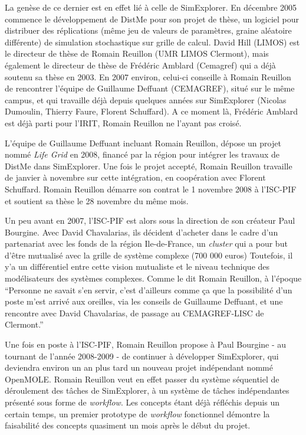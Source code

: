 La genèse de ce dernier est en effet lié à celle de SimExplorer. En décembre 2005 \textcite{Reuillon2008} commence le développement de DistMe pour son projet de thèse, un logiciel pour distribuer des réplications (même jeu de valeurs de paramètres, graine aléatoire différente) de simulation stochastique sur grille de calcul. David Hill (LIMOS) est le directeur de thèse de Romain Reuillon (UMR LIMOS Clermont), mais également le directeur de thèse de Frédéric Amblard (Cemagref) qui a déjà soutenu sa thèse en 2003. En 2007 environ, celui-ci conseille à Romain Reuillon de rencontrer l'équipe de Guillaume Deffuant (CEMAGREF), situé sur le même campus, et qui travaille déjà depuis quelques années sur SimExplorer (Nicolas Dumoulin, Thierry Faure, Florent Schuffard). A ce moment là, Frédéric Amblard est déjà parti pour l'IRIT, Romain Reuillon ne l'ayant pas croisé.

L'équipe de Guillaume Deffuant incluant Romain Reuillon, dépose un projet nommé \textit{Life Grid} en 2008, financé par la région pour intégrer les travaux de DistMe dans SimExplorer. Une fois le projet accepté, Romain Reuillon travaille de janvier à novembre sur cette intégration, en coopération avec Florent Schuffard. Romain Reuillon démarre son contrat le 1 novembre 2008 à l'ISC-PIF et soutient sa thèse le 28 novembre du même mois.

Un peu avant en 2007, l'ISC-PIF est alors sous la direction de son créateur Paul Bourgine. Avec David Chavalarias, ils décident d'acheter dans le cadre d'un partenariat avec les fonds de la région Ile-de-France, un \textit{cluster} qui a pour but d'être mutualisé avec la grille de système complexe (700 000 euros) Toutefois, il y'a un différentiel entre cette vision mutualiste et le niveau technique des modélisateurs des systèmes complexes. Comme le dit Romain Reuillon, à l'époque \enquote{Personne ne savait s'en servir, c'est d'ailleurs comme ça que la possibilité d'un poste m'est arrivé aux oreilles, via les conseils de Guillaume Deffuant, et une rencontre avec David Chavalarias, de passage au CEMAGREF-LISC de Clermont.}

Une fois en poste à l'ISC-PIF, Romain Reuillon propose à Paul Bourgine - au tournant de l'année 2008-2009 - de continuer à développer SimExplorer, qui deviendra environ un an plus tard un nouveau projet indépendant nommé OpenMOLE. Romain Reuillon veut en effet passer du système séquentiel de déroulement des tâches de SimExplorer, à un système de tâches indépendantes présenté sous forme de \textit{workflow}. Les concepts étant déjà réfléchis depuis un certain temps, un premier prototype de \textit{workflow} fonctionnel démontre la faisabilité des concepts quasiment un mois après le début du projet.

